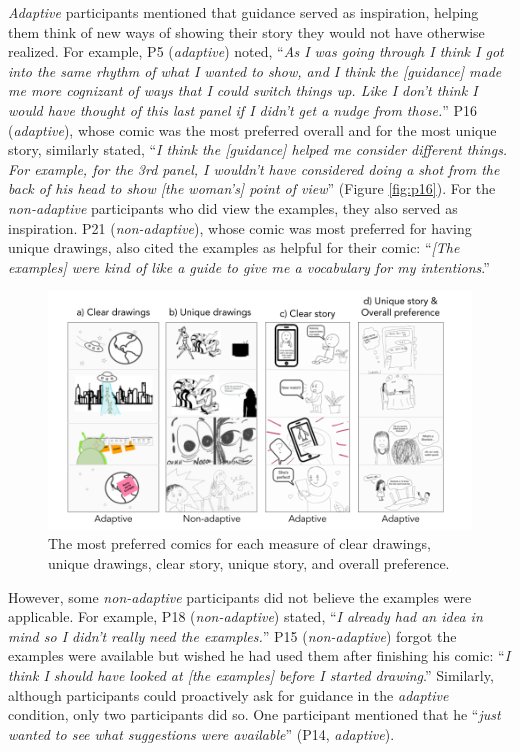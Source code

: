 \textit{Adaptive} participants mentioned that guidance served as inspiration, helping them think of new ways of showing their story they would not have otherwise realized. For example, P5 (\textit{adaptive}) noted, ``\textit{As I was going through I think I got into the same rhythm of what I wanted to show, and I think the [guidance] made me more cognizant of ways that I could switch things up. Like I don't think I would have thought of this last panel if I didn't get a nudge from those.}'' P16 (\textit{adaptive}), whose comic was the most preferred overall and for the most unique story, similarly stated, ``\textit{I think the [guidance] helped me consider different things. For example, for the 3rd panel, I wouldn't have considered doing a shot from the back of his head to show [the woman’s] point of view}'' (Figure \ref{fig:p16}). For the \textit{non-adaptive} participants who did view the examples, they also served as inspiration. P21 (\textit{non-adaptive}), whose comic was most preferred for having unique drawings, also cited the examples as helpful for their comic: ``\textit{[The examples] were kind of like a guide to give me a vocabulary for my intentions}.''

\begin{figure}[t]
  \hspace*{-1cm}%
  \includegraphics[width=\dimexpr\textwidth+2cm\relax]{shown/figures/preferred.png}
  \hspace*{-1cm}%
  \caption{The most preferred comics for each measure of clear drawings, unique drawings, clear story, unique story, and overall preference.}
  \label{fig:preferred}
\end{figure}

However, some \textit{non-adaptive} participants did not believe the examples were applicable. For example, P18 (\textit{non-adaptive}) stated, ``\textit{I already had an idea in mind so I didn’t really need the examples.}'' P15 (\textit{non-adaptive}) forgot the examples were available but wished he had used them after finishing his comic: ``\textit{I think I should have looked at [the examples] before I started drawing}.'' Similarly, although participants could proactively ask for guidance in the \textit{adaptive} condition, only two participants did so. One participant mentioned that he ``\textit{just wanted to see what suggestions were available}'' (P14, \textit{adaptive}). 


